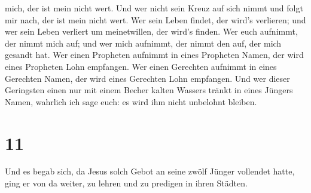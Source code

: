 mich, der ist mein nicht wert.  Und wer nicht sein Kreuz
auf sich nimmt und folgt mir nach, der ist mein nicht wert.
 Wer sein Leben findet, der wird's verlieren; und wer
sein Leben verliert um meinetwillen, der wird's finden. 
Wer euch aufnimmt, der nimmt mich auf; und wer mich aufnimmt, der nimmt
den auf, der mich gesandt hat.  Wer einen Propheten
aufnimmt in eines Propheten Namen, der wird eines Propheten Lohn
empfangen. Wer einen Gerechten aufnimmt in eines Gerechten Namen, der
wird eines Gerechten Lohn empfangen.  Und wer dieser
Geringsten einen nur mit einem Becher kalten Wassers tränkt in eines
Jüngers Namen, wahrlich ich sage euch: es wird ihm nicht unbelohnt
bleiben.

\hypertarget{section-10}{%
\section{11}\label{section-10}}

 Und es begab sich, da Jesus solch Gebot an seine zwölf
Jünger vollendet hatte, ging er von da weiter, zu lehren und zu predigen
in ihren Städten.

